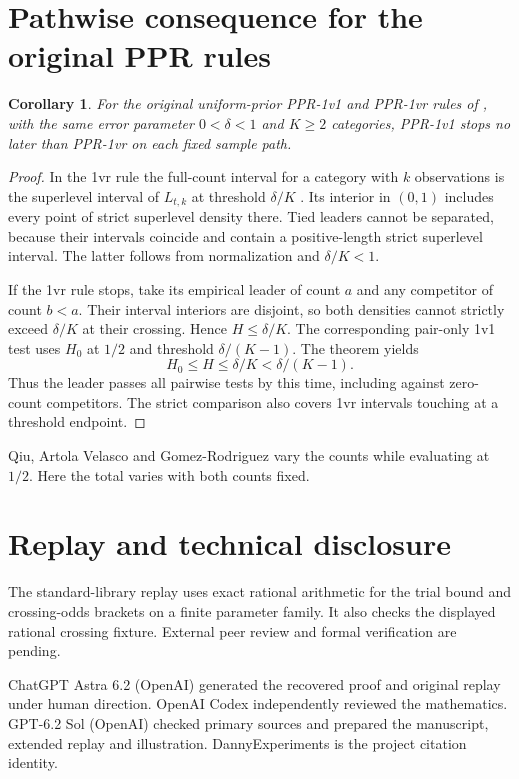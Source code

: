 \documentclass[11pt,a4paper]{amsart}
\newtheorem{corollary}[theorem]{Corollary}
\begin{document}
\section{Pathwise consequence for the original PPR rules}
\begin{corollary}
For the original uniform-prior PPR-1v1 and PPR-1vr rules of \cite{aj}, with the same error parameter $0<\delta<1$ and $K\ge2$ categories, PPR-1v1 stops no later than PPR-1vr on each fixed sample path.
\end{corollary}
\begin{proof}
In the 1vr rule the full-count interval for a category with $k$ observations is the superlevel interval of $L_{t,k}$ at threshold $\delta/K$ \cite[Sections~3.2 and C.2]{aj}. Its interior in $(0,1)$ includes every point of strict superlevel density there. Tied leaders cannot be separated, because their intervals coincide and contain a positive-length strict superlevel interval. The latter follows from normalization and $\delta/K<1$.

If the 1vr rule stops, take its empirical leader of count $a$ and any competitor of count $b<a$. Their interval interiors are disjoint, so both densities cannot strictly exceed $\delta/K$ at their crossing. Hence $H\le\delta/K$. The corresponding pair-only 1v1 test uses $H_0$ at $1/2$ and threshold $\delta/(K-1)$. The theorem yields
\[
                H_0\le H\le \delta/K < \delta/(K-1).
\]
Thus the leader passes all pairwise tests by this time, including against zero-count competitors. The strict comparison also covers 1vr intervals touching at a threshold endpoint.
\end{proof}

Qiu, Artola Velasco and Gomez-Rodriguez \cite[Appendix~A.1]{qiu} vary the counts while evaluating at $1/2$. Here the total varies with both counts fixed.

\section*{Replay and technical disclosure}
The standard-library replay uses exact rational arithmetic for the trial bound and crossing-odds brackets on a finite parameter family. It also checks the displayed rational crossing fixture. External peer review and formal verification are pending.

ChatGPT Astra 6.2 (OpenAI) generated the recovered proof and original replay under human direction. OpenAI Codex independently reviewed the mathematics. GPT-6.2 Sol (OpenAI) checked primary sources and prepared the manuscript, extended replay and illustration. DannyExperiments is the project citation identity.



\end{document}
